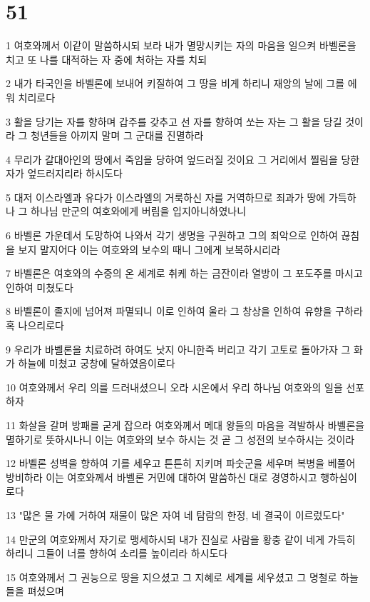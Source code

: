 \chapter{51}

\par 1 여호와께서 이같이 말씀하시되 보라 내가 멸망시키는 자의 마음을 일으켜 바벨론을 치고 또 나를 대적하는 자 중에 처하는 자를 치되
\par 2 내가 타국인을 바벨론에 보내어 키질하여 그 땅을 비게 하리니 재앙의 날에 그를 에워 치리로다
\par 3 활을 당기는 자를 향하며 갑주를 갖추고 선 자를 향하여 쏘는 자는 그 활을 당길 것이라 그 청년들을 아끼지 말며 그 군대를 진멸하라
\par 4 무리가 갈대아인의 땅에서 죽임을 당하여 엎드러질 것이요 그 거리에서 찔림을 당한 자가 엎드러지리라 하시도다
\par 5 대저 이스라엘과 유다가 이스라엘의 거룩하신 자를 거역하므로 죄과가 땅에 가득하나 그 하나님 만군의 여호와에게 버림을 입지아니하였나니
\par 6 바벨론 가운데서 도망하여 나와서 각기 생명을 구원하고 그의 죄악으로 인하여 끊침을 보지 말지어다 이는 여호와의 보수의 때니 그에게 보복하시리라
\par 7 바벨론은 여호와의 수중의 온 세계로 취케 하는 금잔이라 열방이 그 포도주를 마시고 인하여 미쳤도다
\par 8 바벨론이 졸지에 넘어져 파멸되니 이로 인하여 울라 그 창상을 인하여 유향을 구하라 혹 나으리로다
\par 9 우리가 바벨론을 치료하려 하여도 낫지 아니한즉 버리고 각기 고토로 돌아가자 그 화가 하늘에 미쳤고 궁창에 달하였음이로다
\par 10 여호와께서 우리 의를 드러내셨으니 오라 시온에서 우리 하나님 여호와의 일을 선포하자
\par 11 화살을 갈며 방패를 굳게 잡으라 여호와께서 메대 왕들의 마음을 격발하사 바벨론을 멸하기로 뜻하시나니 이는 여호와의 보수 하시는 것 곧 그 성전의 보수하시는 것이라
\par 12 바벨론 성벽을 향하여 기를 세우고 튼튼히 지키며 파숫군을 세우며 복병을 베풀어 방비하라 이는 여호와께서 바벨론 거민에 대하여 말씀하신 대로 경영하시고 행하심이로다
\par 13 "많은 물 가에 거하여 재물이 많은 자여 네 탐람의 한정, 네 결국이 이르렀도다"
\par 14 만군의 여호와께서 자기로 맹세하시되 내가 진실로 사람을 황충 같이 네게 가득히 하리니 그들이 너를 향하여 소리를 높이리라 하시도다
\par 15 여호와께서 그 권능으로 땅을 지으셨고 그 지혜로 세계를 세우셨고 그 명철로 하늘들을 펴셨으며
